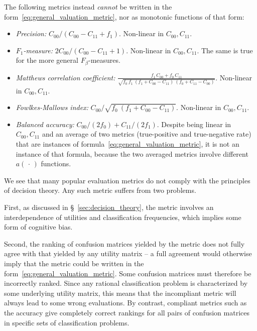 \documentclass[\ifafour a4paper,12pt,\else a5paper,10pt,\fi%
onecolumn,oneside,article,%
british%
]{memoir}
\theoremstyle{remark}
\theoremstyle{innote}
\newcommand*{\dotv}{\mathord{\,\cdot\,}}%
\renewcommand*{\|}[1][]{\nonscript\:#1\vert\nonscript\:\mathopen{}}
\newcommand*{\sect}{\S}%
\newcommand*{\itemno}{{\fontencoding{U}\fontfamily{pzd}\selectfont\symbol{55}}}
\begin{document}
The following metrics instead \emph{cannot} be written in the form~\eqref{eq:general_valuation_metric}, nor as monotonic functions of that form:
\begin{itemize}
\item[\itemno] \emph{Precision:} $C_{00}/(C_{00}-C_{11}+f_{1})$. Non-linear in $C_{00}, C_{11}$.

\item[\itemno] \emph{$F_{1}$-measure:} $2 C_{00}/(C_{00} - C_{11} + 1)$. Non-linear in $C_{00}, C_{11}$. The same is true for the more general $F_{\beta}$-measures.

\item[\itemno] \emph{Matthews correlation coefficient:} $\frac{
    f_{1}\,C_{00} + f_{0}\,C_{11}}{\sqrt{
      f_{0}\ f_{1}\ (f_{1} + C_{00} - C_{11})\ (f_{0} + C_{11} - C_{00})
    }}$. Non-linear in $C_{00}, C_{11}$.

\item[\itemno] \emph{Fowlkes-Mallows index:} $C_{00}/\sqrt{
      f_{0}\ (f_{1} + C_{00} - C_{11})}$. Non-linear in $C_{00}, C_{11}$.

  \item[\itemno] \emph{Balanced accuracy:} $C_{00}/(2 f_{0}) + C_{11}/(2 f_{1})$. Despite being linear in $C_{00}, C_{11}$ and an average of two metrics (true-positive and true-negative rate) that are instances of formula~\eqref{eq:general_valuation_metric}, it is not an instance of that formula, because the two averaged metrics involve different $a(\dotv)$ functions.
\end{itemize}

We see that many popular evaluation metrics do not comply with the principles of decision theory. Any such metric suffers from two problems.

First, as discussed in \sect~\ref{sec:decision_theory}, the metric involves an interdependence of utilities and classification frequencies, which implies some form of cognitive bias\autocites[discuss such biases regarding the $F_{1}$-measure]{handetal2018}.

Second, the ranking of confusion matrices yielded by the metric does not fully agree with that yielded by any utility matrix -- a full agreement would otherwise imply that the metric could be written in the form~\eqref{eq:general_valuation_metric}. Some confusion matrices must therefore be incorrectly ranked. Since any rational classification problem is characterized by some underlying utility matrix, this means that the incompliant metric will always lead to some wrong evaluations. By contrast, compliant metrics such as the accuracy give completely correct rankings for all pairs of confusion matrices in specific sets of classification problems.
\end{document}

